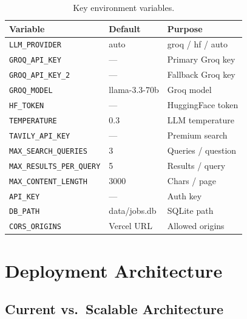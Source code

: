 \documentclass[10pt, twocolumn]{article}
\begin{document}
\begin{table}[H]
  \centering
  \small
  \caption{Key environment variables.}
  \label{tab:config}
  \footnotesize
  \begin{tabular}{p{3.1cm} p{1.1cm} p{2.0cm}}
    \toprule
    \textbf{Variable} & \textbf{Default} & \textbf{Purpose} \\
    \midrule
    \texttt{LLM\_PROVIDER}            & auto         & groq / hf / auto \\
    \texttt{GROQ\_API\_KEY}           & —            & Primary Groq key \\
    \texttt{GROQ\_API\_KEY\_2}        & —            & Fallback Groq key \\
    \texttt{GROQ\_MODEL}              & llama-3.3-70b & Groq model \\
    \texttt{HF\_TOKEN}                & —            & HuggingFace token \\
    \texttt{TEMPERATURE}              & 0.3          & LLM temperature \\
    \texttt{TAVILY\_API\_KEY}         & —            & Premium search \\
    \texttt{MAX\_SEARCH\_QUERIES}     & 3            & Queries / question \\
    \texttt{MAX\_RESULTS\_PER\_QUERY} & 5            & Results / query \\
    \texttt{MAX\_CONTENT\_LENGTH}     & 3000         & Chars / page \\
    \texttt{API\_KEY}                 & —            & Auth key \\
    \texttt{DB\_PATH}                 & data/jobs.db & SQLite path \\
    \texttt{CORS\_ORIGINS}            & Vercel URL   & Allowed origins \\
    \bottomrule
  \end{tabular}
\end{table}

\section{Deployment Architecture}

\subsection{Current vs.\ Scalable Architecture}
\end{document}
